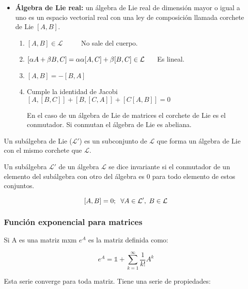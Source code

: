 \documentclass{article}
\begin{document}
\begin{itemize}
\item \textbf{Álgebra de Lie real:} un álgebra de Lie real de dimensión mayor o igual a uno es un espacio vectorial real con una ley de composición llamada corchete de Lie $[A,B]$.

\begin{enumerate}

 \item $[A,B] \in \mathcal{L} \hspace{1cm}$ No sale del cuerpo.

 \item $[\alpha A + \beta B,C]=\alpha \alpha[A,C] + \beta [B,C] \in \mathcal{ L} \hspace{0.5cm}$ Es lineal.

\item $[A,B]=-[B,A]$

\item Cumple la identidad de Jacobi $[A,[B,C]]+[B,[C,A]]+[C[A,B]]=0$

En el caso de un álgebra de Lie de matrices el corchete de Lie es el conmutador. Si conmutan el álgebra de Lie es abeliana.
 \end{enumerate}
\end{itemize}

Un subálgebra de Lie ($\mathcal{L}'$) es un subconjunto de $\mathcal{L}$ que forma un álgebra de Lie con el mismo corchete que $\mathcal{L}$.

Un subálgebra $\mathcal{L}'$  de un álgebra $\mathcal{L}$ se dice invariante si el conmutador de un elemento del subálgebra con otro del álgebra es 0 para todo elemento de estos conjuntos.

$$[A,B]=0; \hspace{0.2cm} \forall A\in \mathcal{L}' , \hspace{0.1cm} B \in \mathcal{L}$$

\subsubsection{Función exponencial para matrices}

Si A es una matriz mxm $e^A$ es la matriz definida como:

$$e^A=\mathds{1}+\sum _{k=1}^\infty \frac{1}{k!}A^k$$

Esta serie converge para toda matriz. Tiene una serie de propiedades:
\end{document}
